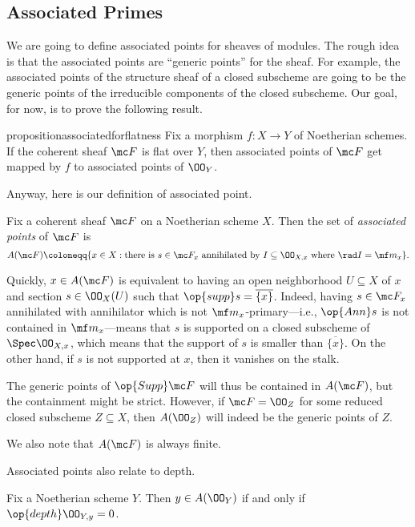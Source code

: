 \documentclass[../notes.tex]{subfiles}
\begin{document}
\subsection{Associated Primes}
We are going to define associated points for sheaves of modules. The rough idea is that the associated points are ``generic points'' for the sheaf. For example, the associated points of the structure sheaf of a closed subscheme are going to be the generic points of the irreducible components of the closed subscheme. Our goal, for now, is to prove the following result.
\begin{restatable}{proposition}{associatedforflatness} \label{prop:flatness-by-associated}
	Fix a morphism $f\colon X\to Y$ of Noetherian schemes. If the coherent sheaf $\mc F$ is flat over $Y$, then associated points of $\mc F$ get mapped by $f$ to associated points of $\OO_Y$.
\end{restatable}
\noindent Anyway, here is our definition of associated point.
\begin{definition}
	Fix a coherent sheaf $\mc F$ on a Noetherian scheme $X$. Then the set of \textit{associated points} of $\mc F$ is
	\[A(\mc F)\coloneqq\{x\in X:\text{there is }s\in\mc F_x\text{ annihilated by }I\subseteq\OO_{X,x}\text{ where }\rad I=\mf m_x\}.\]
\end{definition}
\begin{remark}
	Quickly, $x\in A(\mc F)$ is equivalent to having an open neighborhood $U\subseteq X$ of $x$ and section $s\in\OO_X(U)$ such that $\op{supp}s=\overline{\{x\}}$. Indeed, having $s\in\mc F_x$ annihilated with annihilator which is not $\mf m_x$-primary---i.e., $\op{Ann}s$ is not contained in $\mf m_x$---means that $s$ is supported on a closed subscheme of $\Spec\OO_{X,x}$, which means that the support of $s$ is smaller than $\overline{\{x\}}$. On the other hand, if $s$ is not supported at $x$, then it vanishes on the stalk.
\end{remark}
\begin{remark}
	The generic points of $\op{Supp}\mc F$ will thus be contained in $A(\mc F)$, but the containment might be strict. However, if $\mc F=\OO_Z$ for some reduced closed subscheme $Z\subseteq X$, then $A(\OO_Z)$ will indeed be the generic points of $Z$.
\end{remark}
\begin{remark}
	We also note that $A(\mc F)$ is always finite.
\end{remark}
Associated points also relate to depth.
\begin{lemma} \label{lem:associated-has-no-depth}
	Fix a Noetherian scheme $Y$. Then $y\in A(\OO_Y)$ if and only if $\op{depth}\OO_{Y,y}=0$.
\end{lemma}
\end{document}
